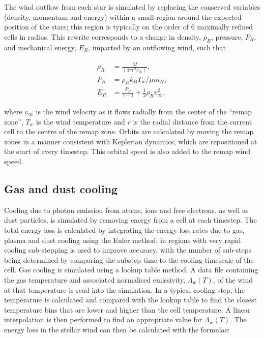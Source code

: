 \documentclass[fleqn,usenatbib]{mnras}
\begin{document}
The wind outflow from each star is simulated by replacing the conserved variables (density, momentum and energy) within a small region around the expected position of the stars; this region is typically on the order of 6 maximally refined cells in radius.
This rewrite corresponds to a change in density, $\rho_R$, pressure, $P_R$, and mechanical energy, $E_R$, imparted by an outflowing wind, such that

\begin{subequations}
  \begin{align}
    \rho_R & = \frac{\dot M}{(4 \pi r^2 v_\infty)} , \\
    P_R    & = \rho_R k_B T_w / \mu m_H , \\
    E_R    & = \frac{P_R}{\gamma - 1} + \frac{1}{2} \rho_{R} v_\infty^2 ,
  \end{align}
\end{subequations}

\noindent
where $v_\infty$ is the wind velocity as it flows radially from the center of the ``remap zone'', $T_w$ is the wind temperature and $r$ is the radial distance from the current cell to the centre of the remap zone.
Orbits are calculated by moving the remap zones in a manner consistent with Keplerian dynamics, which are repositioned at the start of every timestep.
This orbital speed is also added to the remap wind speed.


\subsection{Gas and dust cooling}
\label{sec:gas-dust-cooling}

Cooling due to photon emission from atoms, ions and free electrons, as well as dust particles, is simulated by removing energy from a cell at each timestep.
The total energy loss is calculated by integrating the energy loss rates due to gas, plasma and dust cooling using the Euler method; in regions with very rapid cooling sub-stepping is used to improve accuracy, with the number of sub-steps being determined by comparing the substep time to the cooling timescale of the cell.
Gas cooling is simulated using a lookup table method.
A data file containing the gas temperature and associated normalised emissivity, $\Lambda_w(T)$, of the wind at that temperature is read into the simulation.
In a typical cooling step, the temperature is calculated and compared with the lookup table to find the closest temperature bins that are lower and higher than the cell temperature.
A linear interpolation is then performed to find an appropriate value for $\Lambda_\text{w} (T)$.
The energy loss in the stellar wind can then be calculated with the formulae:
\end{document}
